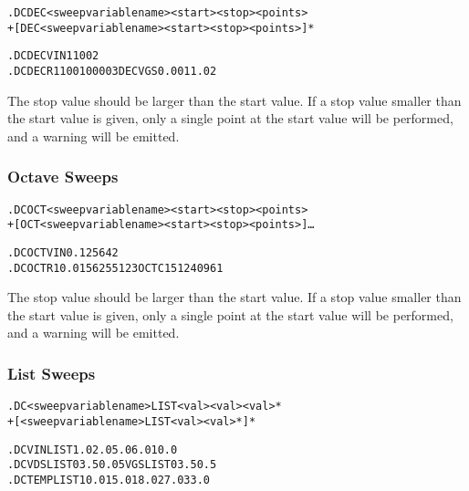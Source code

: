 \begin{Command}
\format
\begin{alltt}
.DC DEC <sweep variable name> <start> <stop> <points>
+ [DEC <sweep variable name> <start> <stop> <points>]*
\end{alltt}

\examples
\begin{alltt}
.DC DEC VIN 1 100 2 
.DC DEC R1 100 10000 3 DEC VGS 0.001 1.0 2
\end{alltt}

\comments
The stop value should be larger than the start value.  If a stop value
smaller than the start value is given, only a single point at the
start value will be performed, and a warning will be emitted.

\end{Command}

\subsubsection{Octave Sweeps}
 

\begin{Command}
\format
\begin{alltt}
.DC OCT <sweep variable name> <start> <stop> <points>
+ [OCT <sweep variable name><start> <stop> <points>]\ldots 
\end{alltt}

\examples
\begin{alltt}
.DC OCT VIN 0.125 64 2 
.DC OCT R1 0.015625 512 3 OCT C1 512 4096 1
\end{alltt}

\comments
The stop value should be larger than the start value.  If a stop value
smaller than the start value is given, only a single point at the
start value will be performed, and a warning will be emitted.

\end{Command}

\subsubsection{List Sweeps}
 

\begin{Command}
\format
\begin{alltt}
.DC <sweep variable name> LIST <val> <val> <val>*
+ [ <sweep variable name> LIST <val> <val>* ]*
\end{alltt}

\examples
\begin{alltt}
.DC VIN LIST 1.0 2.0 5.0 6.0 10.0 
.DC VDS LIST 0 3.5 0.05 VGS LIST 0 3.5 0.5
.DC TEMP LIST 10.0 15.0 18.0 27.0 33.0
\end{alltt}

\end{Command}



